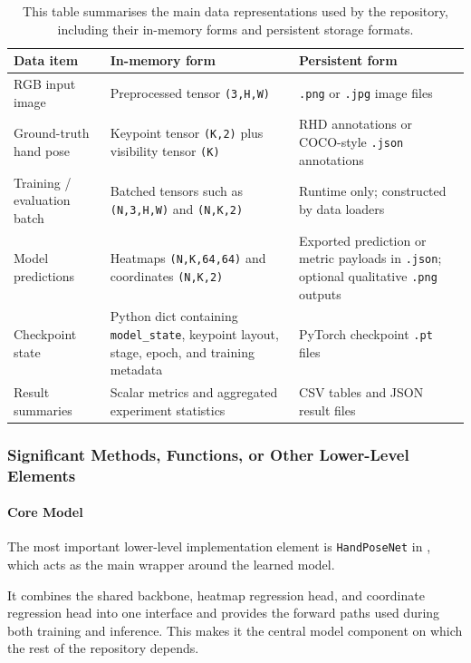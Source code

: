 ﻿\documentclass[11pt,a4paper]{article}
\begin{document}
\begin{table}[htbp]
\centering
\small
\begin{tabular}{|p{}|p{}|p{}|}
\hline
\textbf{Data item} & \textbf{In-memory form} & \textbf{Persistent form} \\
\hline
RGB input image & Preprocessed tensor \texttt{(3,H,W)} & \texttt{.png} or \texttt{.jpg} image files \\
\hline
Ground-truth hand pose & Keypoint tensor \texttt{(K,2)} plus visibility tensor \texttt{(K)} & RHD annotations or COCO-style \texttt{.json} annotations \\
\hline
Training / evaluation batch & Batched tensors such as \texttt{(N,3,H,W)} and \texttt{(N,K,2)} & Runtime only; constructed by data loaders \\
\hline
Model predictions & Heatmaps \texttt{(N,K,64,64)} and coordinates \texttt{(N,K,2)} & Exported prediction or metric payloads in \texttt{.json}; optional qualitative \texttt{.png} outputs \\
\hline
Checkpoint state & Python dict containing \texttt{model\_state}, keypoint layout, stage, epoch, and training metadata & PyTorch checkpoint \texttt{.pt} files \\
\hline
Result summaries & Scalar metrics and aggregated experiment statistics & CSV tables and JSON result files \\
\hline
\end{tabular}
\caption{This table summarises the main data representations used by the repository, including their in-memory forms and persistent storage formats.}
\label{tab:data-representations}
\end{table}

\subsubsection{Significant Methods, Functions, or Other Lower-Level Elements}

\paragraph*{Core Model}

The most important lower-level implementation element is
\texttt{HandPoseNet} in , which
acts as the main wrapper around the learned model.

\medskip

\noindent
It combines the shared backbone, heatmap regression head, and coordinate
regression head into one interface and provides the forward paths used during
both training and inference. This makes it the central model component on
which the rest of the repository depends.
\end{document}
